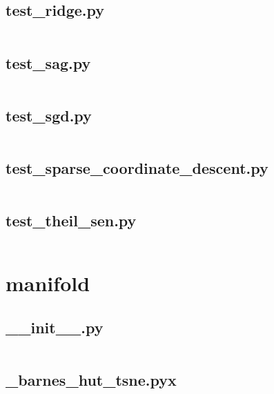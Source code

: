 \documentclass{article}
\begin{document}
\subsection{test\_ridge.py}
\inputminted{python}{/home/dufferzafar/dev/@clones/scikit-learn/sklearn/linear_model/tests/test_ridge.py}
\newpage

\subsection{test\_sag.py}
\inputminted{python}{/home/dufferzafar/dev/@clones/scikit-learn/sklearn/linear_model/tests/test_sag.py}
\newpage

\subsection{test\_sgd.py}
\inputminted{python}{/home/dufferzafar/dev/@clones/scikit-learn/sklearn/linear_model/tests/test_sgd.py}
\newpage

\subsection{test\_sparse\_coordinate\_descent.py}
\inputminted{python}{/home/dufferzafar/dev/@clones/scikit-learn/sklearn/linear_model/tests/test_sparse_coordinate_descent.py}
\newpage

\subsection{test\_theil\_sen.py}
\inputminted{python}{/home/dufferzafar/dev/@clones/scikit-learn/sklearn/linear_model/tests/test_theil_sen.py}
\newpage

\section{manifold}

\subsection{\_\_init\_\_.py}
\inputminted{python}{/home/dufferzafar/dev/@clones/scikit-learn/sklearn/manifold/__init__.py}
\newpage

\subsection{\_barnes\_hut\_tsne.pyx}
\inputminted{cython}{/home/dufferzafar/dev/@clones/scikit-learn/sklearn/manifold/_barnes_hut_tsne.pyx}
\newpage
\end{document}

